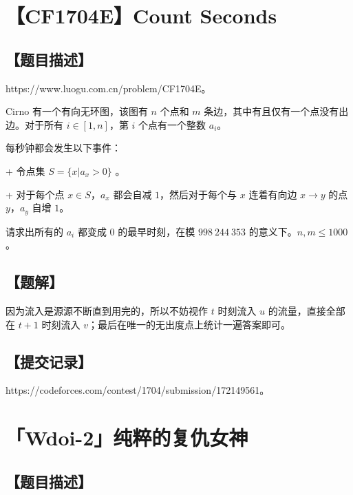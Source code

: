 \documentclass[UTF8,12pt,a4paper]{ctexart}
\begin{document}
	\section*{【CF1704E】Count Seconds}
	
	\subsection*{【题目描述】}
	
	https://www.luogu.com.cn/problem/CF1704E。
	
	Cirno 有一个有向无环图，该图有 $n$ 个点和 $m$ 条边，其中有且仅有一个点没有出边。对于所有 $i\in[1,n]$，第 $i$ 个点有一个整数 $a_i$。
	
	每秒钟都会发生以下事件：
	
	+ 令点集 $S=\{x|a_x>0\}$ 。
	
	+ 对于每个点 $x\in S$，$a_x$ 都会自减 $1$，然后对于每个与 $x$ 连着有向边 $x\rightarrow y$ 的点 $y$，$a_y$ 自增 $1$。
	
	请求出所有的 $a_i$ 都变成 $0$ 的最早时刻，在模 $998\ 244\ 353$ 的意义下。$n,m\le 1000$。
	
	\subsection*{【题解】}
	
	因为流入是源源不断直到用完的，所以不妨视作 $t$ 时刻流入 $u$ 的流量，直接全部在 $t+1$ 时刻流入 $v$；最后在唯一的无出度点上统计一遍答案即可。
	
	\subsection*{【提交记录】}
	
	https://codeforces.com/contest/1704/submission/172149561。
	
	
	\section*{「Wdoi-2」纯粹的复仇女神}
	
	\subsection*{【题目描述】}
	
\end{document}
